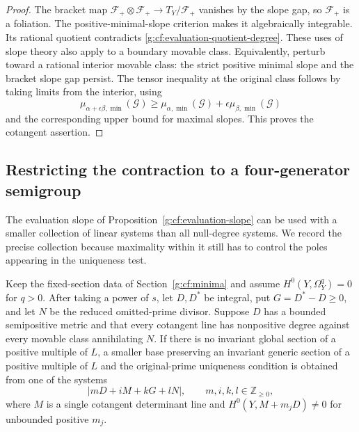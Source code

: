 \begin{proof}
The bracket map
\(\mathcal F_+\otimes\mathcal F_+\to T_Y/\mathcal F_+\)
vanishes by the slope gap, so \(\mathcal F_+\) is a foliation.
The positive-minimal-slope criterion makes it algebraically
integrable.  Its rational quotient contradicts
\eqref{g:cf:evaluation-quotient-degree}.  These uses of slope theory
also apply to a boundary movable class.  Equivalently, perturb
toward a rational interior movable class: the strict positive
minimal slope and the bracket slope gap persist.  The tensor
inequality at the original class follows by taking limits from
the interior, using
\[
 \mu_{\alpha+\epsilon\beta,\min}(\mathcal G)
 \geq\mu_{\alpha,\min}(\mathcal G)
       +\epsilon\mu_{\beta,\min}(\mathcal G)
\]
and the corresponding upper bound for maximal slopes.  This
proves the cotangent assertion.
\end{proof}

\subsection{Restricting the contraction to a four-generator semigroup}

The evaluation slope of Proposition~\ref{g:cf:evaluation-slope} can be
used with a smaller collection of linear systems than all null-degree
systems. We record the precise collection because maximality within it
still has to control the poles appearing in the uniqueness test.

\begin{proposition}\label{g:cf:finite-semigroup}
Keep the fixed-section data of Section~\ref{g:cf:minima} and assume
$H^0(Y,\Omega_Y^q)=0$ for $q>0$. After taking a power of $s$, let $D,D^*$
be integral, put $G=D^*-D\geq0$, and let $N$ be the reduced omitted-prime
divisor. Suppose $D$ has a bounded semipositive metric and that every
cotangent line has nonpositive degree against every movable class
annihilating $N$. If there is no invariant global section of a positive
multiple of $L$, a smaller base preserving an invariant generic section
of a positive multiple of $L$ and the original-prime uniqueness condition
is obtained from one of the systems
\[
 |mD+iM+kG+lN|,\qquad m,i,k,l\in\mathbb Z_{\geq0},
\]
where $M$ is a single cotangent determinant line and
$H^0(Y,M+m_jD)\ne0$ for unbounded positive $m_j$.
\end{proposition}

